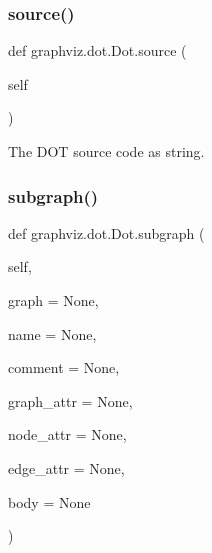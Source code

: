 \subsubsection{\texorpdfstring{source()}{source()}}
{\footnotesize\ttfamily def graphviz.\+dot.\+Dot.\+source (\begin{DoxyParamCaption}\item[{}]{self }\end{DoxyParamCaption})}

\begin{DoxyVerb}The DOT source code as string.\end{DoxyVerb}
 \mbox{\label{classgraphviz_1_1dot_1_1Dot_afd0431341f53b05bab054c6bf1ade7ea}} 
\subsubsection{\texorpdfstring{subgraph()}{subgraph()}}
{\footnotesize\ttfamily def graphviz.\+dot.\+Dot.\+subgraph (\begin{DoxyParamCaption}\item[{}]{self,  }\item[{}]{graph = {\ttfamily None},  }\item[{}]{name = {\ttfamily None},  }\item[{}]{comment = {\ttfamily None},  }\item[{}]{graph\+\_\+attr = {\ttfamily None},  }\item[{}]{node\+\_\+attr = {\ttfamily None},  }\item[{}]{edge\+\_\+attr = {\ttfamily None},  }\item[{}]{body = {\ttfamily None} }\end{DoxyParamCaption})}

